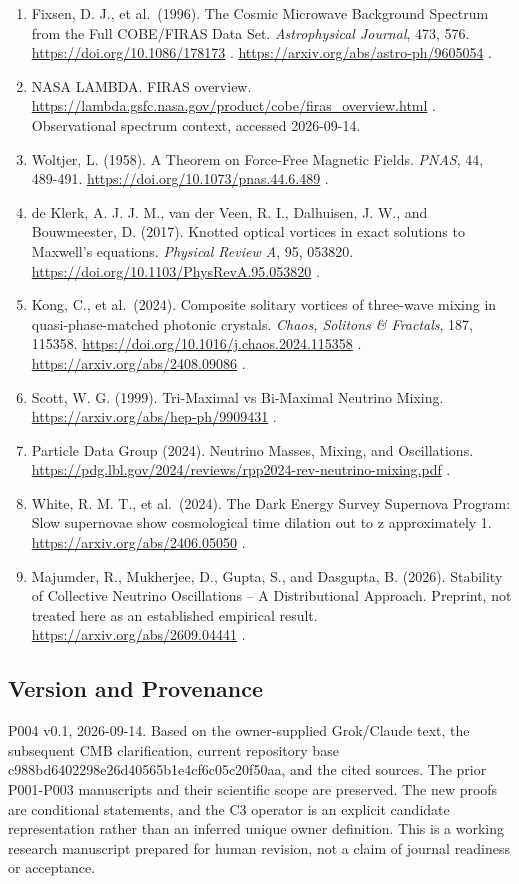 \documentclass[
  11pt,
]{article}
\providecommand{\tightlist}{%
  \setlength{\itemsep}{0pt}\setlength{\parskip}{0pt}}
\begin{document}
\begin{enumerate}
\def\labelenumi{\arabic{enumi}.}
\tightlist
\item
  Fixsen, D. J., et al.~(1996). The Cosmic Microwave Background Spectrum
  from the Full COBE/FIRAS Data Set. \emph{Astrophysical Journal}, 473,
  576. \url{https://doi.org/10.1086/178173} .
  \url{https://arxiv.org/abs/astro-ph/9605054} .
\item
  NASA LAMBDA. FIRAS overview.
  \url{https://lambda.gsfc.nasa.gov/product/cobe/firas_overview.html} .
  Observational spectrum context, accessed 2026-09-14.
\item
  Woltjer, L. (1958). A Theorem on Force-Free Magnetic Fields.
  \emph{PNAS}, 44, 489-491. \url{https://doi.org/10.1073/pnas.44.6.489}
  .
\item
  de Klerk, A. J. J. M., van der Veen, R. I., Dalhuisen, J. W., and
  Bouwmeester, D. (2017). Knotted optical vortices in exact solutions to
  Maxwell's equations. \emph{Physical Review A}, 95, 053820.
  \url{https://doi.org/10.1103/PhysRevA.95.053820} .
\item
  Kong, C., et al.~(2024). Composite solitary vortices of three-wave
  mixing in quasi-phase-matched photonic crystals. \emph{Chaos, Solitons
  \& Fractals}, 187, 115358.
  \url{https://doi.org/10.1016/j.chaos.2024.115358} .
  \url{https://arxiv.org/abs/2408.09086} .
\item
  Scott, W. G. (1999). Tri-Maximal vs Bi-Maximal Neutrino Mixing.
  \url{https://arxiv.org/abs/hep-ph/9909431} .
\item
  Particle Data Group (2024). Neutrino Masses, Mixing, and Oscillations.
  \url{https://pdg.lbl.gov/2024/reviews/rpp2024-rev-neutrino-mixing.pdf}
  .
\item
  White, R. M. T., et al.~(2024). The Dark Energy Survey Supernova
  Program: Slow supernovae show cosmological time dilation out to z
  approximately 1. \url{https://arxiv.org/abs/2406.05050} .
\item
  Majumder, R., Mukherjee, D., Gupta, S., and Dasgupta, B. (2026).
  Stability of Collective Neutrino Oscillations -- A Distributional
  Approach. Preprint, not treated here as an established empirical
  result. \url{https://arxiv.org/abs/2609.04441} .
\end{enumerate}

\hypertarget{version-and-provenance}{%
\subsection{Version and Provenance}\label{version-and-provenance}}

P004 v0.1, 2026-09-14. Based on the owner-supplied Grok/Claude text, the
subsequent CMB clarification, current repository base
c988bd6402298e26d40565b1e4cf6c05c20f50aa, and the cited sources. The
prior P001-P003 manuscripts and their scientific scope are preserved.
The new proofs are conditional statements, and the C3 operator is an
explicit candidate representation rather than an inferred unique owner
definition. This is a working research manuscript prepared for human
revision, not a claim of journal readiness or acceptance.
\end{document}

